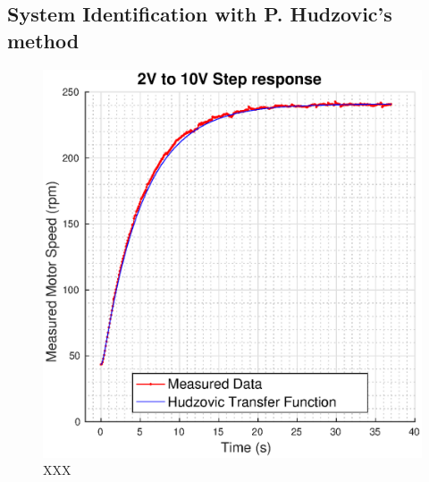 \subsection{System Identification with P. Hudzovic's method}

\begin{figure}[t]
    \centering
    \includegraphics[width=\linewidth]{images/hudzovic}
    \caption{XXX}
\end{figure}

